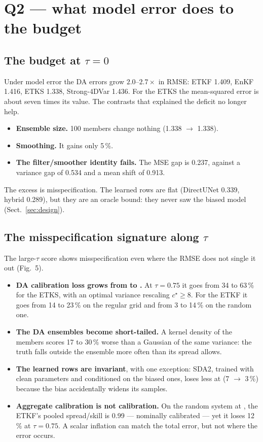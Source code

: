 \section{Q2 --- what model error does to the budget}\label{sec:q2}

\subsection{The budget at \texorpdfstring{$\tau = 0$}{tau = 0}}
Under model error the DA errors grow $2.0$--$2.7\times$ in RMSE: ETKF 1.409, EnKF
1.416, ETKS 1.338, Strong-4DVar 1.436. For the ETKS the mean-squared error is about seven
times its \Sz{} value. The contrasts that explained the \Sz{} deficit no longer
help.
\begin{itemize}[leftmargin=*]
  \item \textbf{Ensemble size.} 100 members change nothing (1.338 $\to$ 1.338).
  \item \textbf{Smoothing.} It gains only 5\,\%.
  \item \textbf{The filter/smoother identity fails.} The MSE gap is 0.237, against
    a variance gap of 0.534 and a mean shift of 0.913.
\end{itemize}
The excess is misspecification. The learned rows are flat (DirectUNet 0.339,
hybrid 0.289), but they are an oracle bound: they never saw the biased model
(Sect.~\ref{sec:design}).

\subsection{The misspecification signature along \texorpdfstring{$\tau$}{tau}}
The large-$\tau$ score shows misspecification even where the RMSE does not
single it out (Fig.~5).
\begin{itemize}[leftmargin=*]
  \item \textbf{DA calibration loss grows from \Sz{} to \So.} At $\tau = 0.75$
    it goes from 34 to 63\,\% for the ETKS, with an optimal variance rescaling
    $c^\star \ge 8$. For the ETKF it goes from 14 to 23\,\% on the regular grid
    and from 3 to 14\,\% on the random one.
  \item \textbf{The DA ensembles become short-tailed.} A kernel density of the
    members scores 17 to 30\,\% worse than a Gaussian of the same variance:
    the truth falls outside the ensemble more often than its spread allows.
  \item \textbf{The learned rows are invariant}, with one exception: SDA2,
    trained with clean parameters and conditioned on the biased ones, loses less
    at \So{} (7 $\to$ 3\,\%) because the bias accidentally widens its samples.
  \item \textbf{Aggregate calibration is not calibration.} On the random system
    at \So, the ETKF's pooled spread/skill is 0.99 --- nominally calibrated ---
    yet it loses 12\,\% at $\tau = 0.75$. A scalar inflation can match the total
    error, but not where the error occurs.
\end{itemize}

